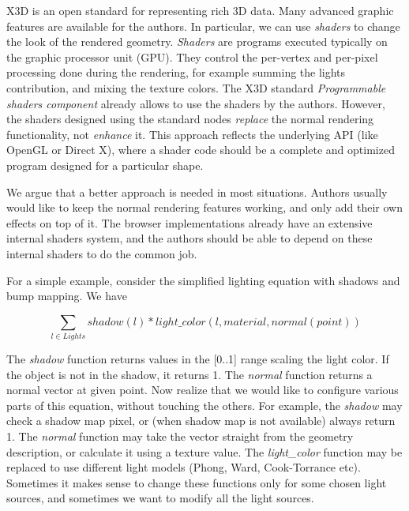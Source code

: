 \documentclass{acmsiggraph}                     %
\begin{document}
X3D \cite{x3d:spec} is an open standard for representing rich 3D data.
Many advanced graphic features are available for the authors.
In particular, we can use \emph{shaders} to change the look of the rendered
geometry.
\emph{Shaders} are programs executed typically on the graphic processor unit
(GPU). They control the per-vertex and per-pixel processing done
during the rendering, for example summing the lights contribution,
and mixing the texture colors.
The X3D standard \textit{Programmable shaders component} already allows to use
the shaders by the authors. However, the shaders designed using
the standard nodes
\textit{replace} the normal rendering functionality, not \textit{enhance} it.
This approach reflects the underlying API (like OpenGL or Direct X),
where a shader code should be a complete and optimized program designed for
a particular shape.

We argue that a better approach is needed in most situations.
Authors usually would like to keep the normal rendering features working,
and only add their own effects on top of it. The browser
implementations already have an extensive internal shaders system,
and the authors should be able to depend on these internal shaders
to do the common job.

For a simple example, consider the simplified lighting equation with shadows
and bump mapping. We have

$$ \sum_{l\in Lights} shadow(l) * light\_color(l, material, normal(point)) $$

The \textit{shadow} function returns values in the [0..1] range
scaling the light color. If the object is not in the shadow, it returns 1.
The \textit{normal} function returns a normal vector at given point.
Now realize that we would like to configure various parts of this equation,
without touching the others.
For example, the \textit{shadow} may check a shadow map pixel,
or (when shadow map is not available) always return 1.
The \textit{normal} function may take the vector straight from
the geometry description, or calculate it using a texture value.
The \textit{light\_color} function may be replaced to use different
light models (Phong, Ward, Cook-Torrance etc). Sometimes it makes sense
to change these functions only for some chosen light sources, and sometimes
we want to modify all the light sources.
\end{document}
